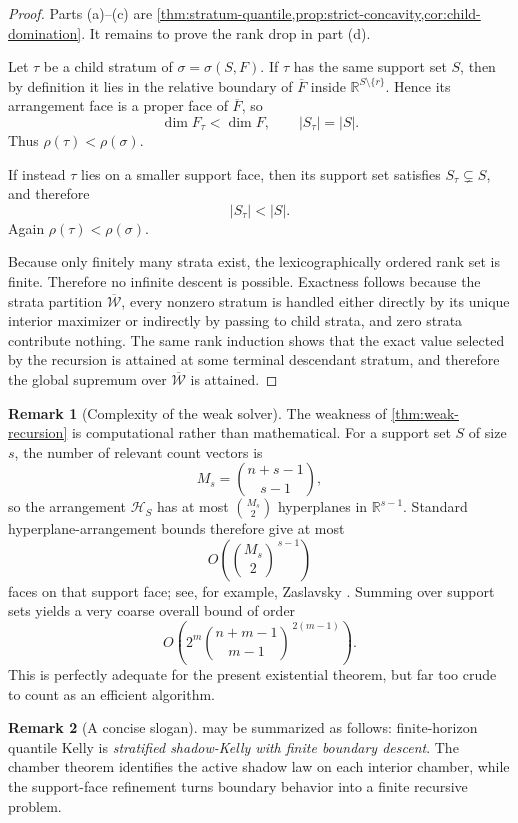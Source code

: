 \documentclass[11pt]{article}
\theoremstyle{definition}
\newtheorem{remark}[remark]{Remark}
\newcommand{\R}{\mathbb{R}}
\newcommand{\1}{\mathbf{1}}
\begin{document}
\begin{proof}
Parts (a)--(c) are \cref{thm:stratum-quantile,prop:strict-concavity,cor:child-domination}. It remains to prove the rank drop in part (d).

Let $\tau$ be a child stratum of $\sigma=\sigma(S,F)$. If $\tau$ has the same support set $S$, then by definition it lies in the relative boundary of $\overline F$ inside $\R^{S\setminus\{r\}}$. Hence its arrangement face is a proper face of $\overline F$, so
\[
\dim F_\tau<\dim F,
\qquad
|S_\tau|=|S|.
\]
Thus $\rho(\tau)<\rho(\sigma)$.

If instead $\tau$ lies on a smaller support face, then its support set satisfies $S_\tau\subsetneq S$, and therefore
\[
|S_\tau|<|S|.
\]
Again $\rho(\tau)<\rho(\sigma)$.

Because only finitely many strata exist, the lexicographically ordered rank set is finite. Therefore no infinite descent is possible. Exactness follows because the strata partition $\overline{\mathcal W}$, every nonzero stratum is handled either directly by its unique interior maximizer or indirectly by passing to child strata, and zero strata contribute nothing. The same rank induction shows that the exact value selected by the recursion is attained at some terminal descendant stratum, and therefore the global supremum over $\overline{\mathcal W}$ is attained.
\end{proof}

\begin{remark}[Complexity of the weak solver]\label{rem:complexity}
The weakness of \cref{thm:weak-recursion} is computational rather than mathematical. For a support set $S$ of size $s$, the number of relevant count vectors is
\[
M_s=\binom{n+s-1}{s-1},
\]
so the arrangement $\mathcal H_S$ has at most $\binom{M_s}{2}$ hyperplanes in $\R^{s-1}$. Standard hyperplane-arrangement bounds therefore give at most
\[
O\!\left(\binom{M_s}{2}^{\,s-1}\right)
\]
faces on that support face; see, for example, Zaslavsky \cite{Zaslavsky1975}. Summing over support sets yields a very coarse overall bound of order
\[
O\!\left(
2^m \binom{n+m-1}{m-1}^{\,2(m-1)}
\right).
\]
This is perfectly adequate for the present existential theorem, but far too crude to count as an efficient algorithm.
\end{remark}

\begin{remark}[A concise slogan]
 may be summarized as follows: finite-horizon quantile Kelly is \emph{stratified shadow-Kelly with finite boundary descent}. The chamber theorem identifies the active shadow law on each interior chamber, while the support-face refinement turns boundary behavior into a finite recursive problem.
\end{remark}
\end{document}
